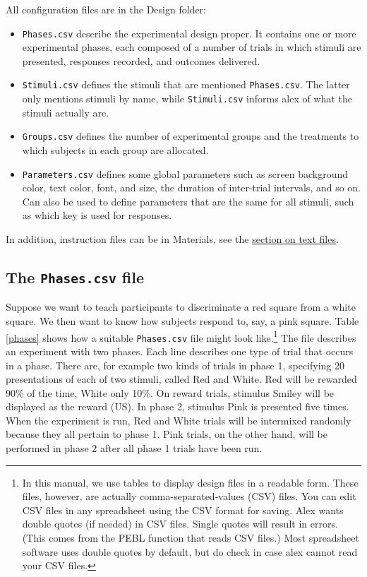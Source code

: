\documentclass[11pt,]{article}
\begin{document}

All configuration files are in the Design folder:

\begin{itemize}
\item
  \texttt{Phases.csv} describe the experimental design proper. It
  contains one or more experimental phases, each composed of a number of
  trials in which stimuli are presented, responses recorded, and
  outcomes delivered.
\item
  \texttt{Stimuli.csv} defines the stimuli that are mentioned
  \texttt{Phases.csv}. The latter only mentions stimuli by name, while
  \texttt{Stimuli.csv} informs alex of what the stimuli actually are.
\item
  \texttt{Groups.csv} defines the number of experimental groups and the
  treatments to which subjects in each group are allocated.
\item
  \texttt{Parameters.csv} defines some global parameters such as screen
  background color, text color, font, and size, the duration of
  inter-trial intervals, and so on. Can also be used to define
  parameters that are the same for all stimuli, such as which key is
  used for responses.
\end{itemize}

In addition, instruction files can be in Materials, see the
\hyperref[textfiles]{section on text files}.

\subsection{The \texttt{Phases.csv} file}\label{the-phases.csv-file}

Suppose we want to teach participants to discriminate a red square from
a white square. We then want to know how subjects respond to, say, a
pink square. Table \ref{phases} shows how a suitable \texttt{Phases.csv}
file might look like.\footnote{In this manual, we use tables to display
  design files in a readable form. These files, however, are actually
  comma-separated-values (CSV) files. You can edit CSV files in any
  spreadsheet using the CSV format for saving. Alex wants double quotes
  (if needed) in CSV files. Single quotes will result in errors. (This
  comes from the PEBL function that reads CSV files.) Most spreadsheet
  software uses double quotes by default, but do check in case alex
  cannot read your CSV files.} The file describes an experiment with two
phases. Each line describes one type of trial that occurs in a phase.
There are, for example two kinds of trials in phase 1, specifying 20
presentations of each of two stimuli, called Red and White. Red will be
rewarded 90\% of the time, White only 10\%. On reward trials, stimulus
Smiley will be displayed as the reward (US). In phase 2, stimulus Pink
is presented five times. When the experiment is run, Red and White
trials will be intermixed randomly because they all pertain to phase 1.
Pink trials, on the other hand, will be performed in phase 2 after all
phase 1 trials have been run.
\end{document}
